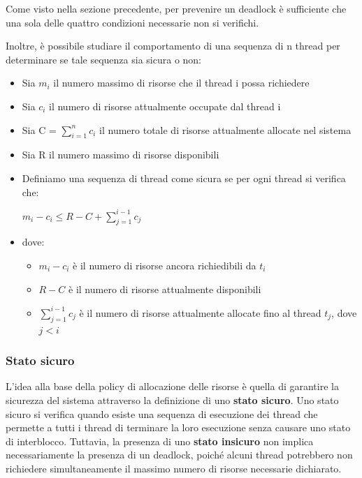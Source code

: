 \documentclass{article}
\begin{document}
Come visto nella sezione precedente, per prevenire un deadlock è sufficiente che una sola delle quattro condizioni necessarie non si verifichi.

Inoltre, è possibile studiare il comportamento di una sequenza di n thread per determinare se tale sequenza sia sicura o non:
\begin{itemize}
    \item Sia $m_{i}$ il numero massimo di risorse che il thread i possa richiedere
    \item Sia $c_{i}$ il numero di risorse attualmente occupate dal thread i
    \item Sia C = $\sum_{i=1}^{n} c_{i}$ il numero totale di risorse attualmente allocate nel sistema
    \item Sia R il numero massimo di risorse disponibili
    \item Definiamo una sequenza di thread come sicura se per ogni thread si verifica che:
    \begin{center}
        $m_{i} - c_{i} \leq R - C + \sum_{j=1}^{i-1} c_{j}$
    \end{center}
    \item dove:
    \begin{itemize}
        \item $m_{i} - c_{i}$ è il numero di risorse ancora richiedibili da $t_{i}$
        \item $R - C$ è il numero di risorse attualmente disponibili
        \item $\sum_{j=1}^{i-1} c_{j}$ è il numero di risorse attualmente allocate fino al thread $t_{j}$, dove $j < i$
    \end{itemize}
\end{itemize}

\subsubsection{Stato sicuro}

L'idea alla base della policy di allocazione delle risorse è quella di garantire la sicurezza del sistema attraverso la definizione di uno \textbf{stato sicuro}. Uno stato sicuro si verifica quando esiste una sequenza di esecuzione dei thread che permette a tutti i thread di terminare la loro esecuzione senza causare uno stato di interblocco. Tuttavia, la presenza di uno \textbf{stato insicuro} non implica necessariamente la presenza di un deadlock, poiché alcuni thread potrebbero non richiedere simultaneamente il massimo numero di risorse necessarie dichiarato.
\end{document}
